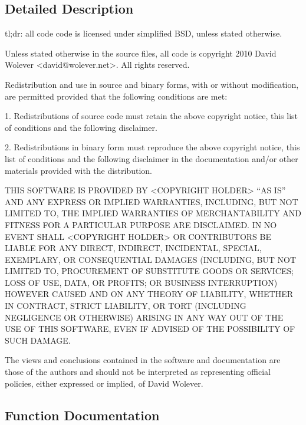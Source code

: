 \subsection{Detailed Description}
\begin{DoxyVerb}tl;dr: all code code is licensed under simplified BSD, unless stated otherwise.

Unless stated otherwise in the source files, all code is copyright 2010 David
Wolever <david@wolever.net>. All rights reserved.

Redistribution and use in source and binary forms, with or without
modification, are permitted provided that the following conditions are met:

   1. Redistributions of source code must retain the above copyright notice,
   this list of conditions and the following disclaimer.

   2. Redistributions in binary form must reproduce the above copyright notice,
   this list of conditions and the following disclaimer in the documentation
   and/or other materials provided with the distribution.

THIS SOFTWARE IS PROVIDED BY <COPYRIGHT HOLDER> ``AS IS'' AND ANY EXPRESS OR
IMPLIED WARRANTIES, INCLUDING, BUT NOT LIMITED TO, THE IMPLIED WARRANTIES OF
MERCHANTABILITY AND FITNESS FOR A PARTICULAR PURPOSE ARE DISCLAIMED. IN NO
EVENT SHALL <COPYRIGHT HOLDER> OR CONTRIBUTORS BE LIABLE FOR ANY DIRECT,
INDIRECT, INCIDENTAL, SPECIAL, EXEMPLARY, OR CONSEQUENTIAL DAMAGES (INCLUDING,
BUT NOT LIMITED TO, PROCUREMENT OF SUBSTITUTE GOODS OR SERVICES; LOSS OF USE,
DATA, OR PROFITS; OR BUSINESS INTERRUPTION) HOWEVER CAUSED AND ON ANY THEORY OF
LIABILITY, WHETHER IN CONTRACT, STRICT LIABILITY, OR TORT (INCLUDING NEGLIGENCE
OR OTHERWISE) ARISING IN ANY WAY OUT OF THE USE OF THIS SOFTWARE, EVEN IF
ADVISED OF THE POSSIBILITY OF SUCH DAMAGE.

The views and conclusions contained in the software and documentation are those
of the authors and should not be interpreted as representing official policies,
either expressed or implied, of David Wolever.\end{DoxyVerb}
 

\subsection{Function Documentation}
\mbox{\label{namespacenumpy_1_1testing_1_1__private_1_1parameterized_a4b29c28a2677fa8772a746cad0bc5477}} 
